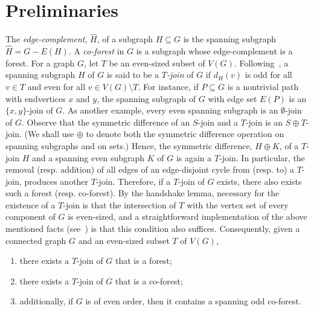 \documentclass[a4paper,12pt]{article}
\numberwithin{equation}{section}
\begin{document}

\section{Preliminaries}

The \textit{edge-complement}, $\widehat{H}$, of a subgraph $H\subseteq G$ is the spanning subgraph $\widehat{H}=G-E(H)$.
A \textit{co-forest} in $G$ is a subgraph whose edge-complement is a forest.
For a graph $G$, let $T$ be an even-sized subset of $V(G)$. Following~\cite{BonMur08}, a spanning subgraph $H$ of $G$ is said to be a \textit{$T$-join} of $G$ if $d_{H}(v)$ is odd for all $v\in T$ and even for all $v\in V(G)\setminus T$. For instance, if $P\subseteq G$ is a nontrivial path with endvertices $x$ and $y$, the spanning subgraph of $G$ with edge set $E(P)$ is an $\{x,y\}$-join of $G$. As another example, every even spanning subgraph is an $\emptyset$-join of $G$. Observe that the symmetric difference of an $S$-join and a $T$-join is an $S\oplus T$-join. (We shall use $\oplus$ to denote both the symmetric difference operation on spanning subgraphs and on sets.) Hence, the symmetric difference, $H\oplus K$, of a $T$-join $H$ and a spanning even subgraph $K$ of $G$ is again a $T$-join. In particular, the removal (resp. addition) of all edges of an edge-disjoint cycle from (resp. to) a $T$-join, produces another $T$-join. Therefore, if a $T$-join of $G$ exists, there also exists such a forest (resp. co-forest). By the handshake lemma, necessary for the existence of a $T$-join is that the intersection of $T$ with the vertex set of every component of $G$ is even-sized, and a straightforward implementation of the  above mentioned facts (see~\cite{Sch03}) is that this condition also suffices. Consequently, given a connected graph $G$ and an even-sized subset $T$ of $V(G)$,
\begin{enumerate}
\item[$(1)$] there exists a $T$-join of $G$ that is a forest;
\item[$(2)$] there exists a $T$-join of $G$ that is a co-forest;
\item[$(3)$] additionally, if $G$ is of even order, then it contains a spanning odd co-forest.
\end{enumerate}
\end{document}
